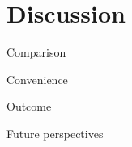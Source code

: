 
\chapter{Discussion}\label{Discussion} %

Comparison

\medskip

Convenience

\medskip

Outcome

\medskip

Future perspectives
